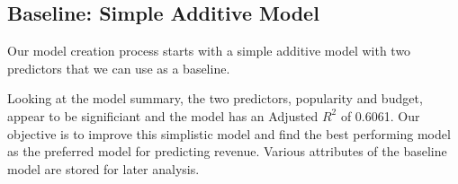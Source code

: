 \documentclass[
]{article}
\newenvironment{Shaded}{\begin{snugshade}}{\end{snugshade}}
\newcommand{\DataTypeTok}[1]{\textcolor[rgb]{0.13,0.29,0.53}{#1}}
\newcommand{\DecValTok}[1]{\textcolor[rgb]{0.00,0.00,0.81}{#1}}
\newcommand{\KeywordTok}[1]{\textcolor[rgb]{0.13,0.29,0.53}{\textbf{#1}}}
\newcommand{\NormalTok}[1]{#1}
\newcommand{\OperatorTok}[1]{\textcolor[rgb]{0.81,0.36,0.00}{\textbf{#1}}}
\newcommand{\StringTok}[1]{\textcolor[rgb]{0.31,0.60,0.02}{#1}}
\begin{document}
\hypertarget{baseline-simple-additive-model}{%
\subsection{Baseline: Simple Additive
Model}\label{baseline-simple-additive-model}}

Our model creation process starts with a simple additive model with two
predictors that we can use as a baseline.

\begin{Shaded}
\end{Shaded}

Looking at the model summary, the two predictors, popularity and budget,
appear to be significiant and the model has an Adjusted \(R^2\) of
0.6061. Our objective is to improve this simplistic model and find the
best performing model as the preferred model for predicting revenue.
Various attributes of the baseline model are stored for later analysis.
\end{document}
